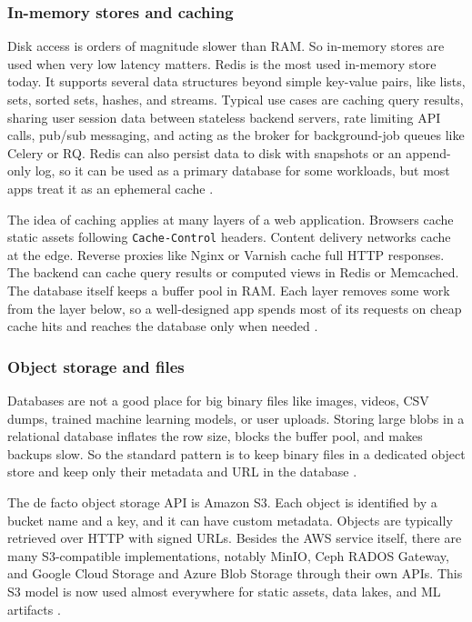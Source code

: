 \subsubsection{In-memory stores and caching}
\label{sec:in-memory}

Disk access is orders of magnitude slower than RAM. So in-memory stores are used when very low latency matters. Redis is the most used in-memory store today. It supports several data structures beyond simple key-value pairs, like lists, sets, sorted sets, hashes, and streams. Typical use cases are caching query results, sharing user session data between stateless backend servers, rate limiting API calls, pub/sub messaging, and acting as the broker for background-job queues like Celery or RQ. Redis can also persist data to disk with snapshots or an append-only log, so it can be used as a primary database for some workloads, but most apps treat it as an ephemeral cache \autocite{redis_use_cases_2024, celery_redis_devto}.

The idea of caching applies at many layers of a web application. Browsers cache static assets following \texttt{Cache-Control} headers. Content delivery networks cache at the edge. Reverse proxies like Nginx or Varnish cache full HTTP responses. The backend can cache query results or computed views in Redis or Memcached. The database itself keeps a buffer pool in RAM. Each layer removes some work from the layer below, so a well-designed app spends most of its requests on cheap cache hits and reaches the database only when needed \autocite{redis_use_cases_2024}.

\subsubsection{Object storage and files}
\label{sec:object-storage}

Databases are not a good place for big binary files like images, videos, CSV dumps, trained machine learning models, or user uploads. Storing large blobs in a relational database inflates the row size, blocks the buffer pool, and makes backups slow. So the standard pattern is to keep binary files in a dedicated object store and keep only their metadata and URL in the database \autocite{alti2024nfs_s3, mondal2024object_big_data}.

The de facto object storage API is Amazon S3. Each object is identified by a bucket name and a key, and it can have custom metadata. Objects are typically retrieved over HTTP with signed URLs. Besides the AWS service itself, there are many S3-compatible implementations, notably MinIO, Ceph RADOS Gateway, and Google Cloud Storage and Azure Blob Storage through their own APIs. This S3 model is now used almost everywhere for static assets, data lakes, and ML artifacts \autocite{alti2024nfs_s3, gadban2021s3_hpc, mondal2024object_big_data}.

